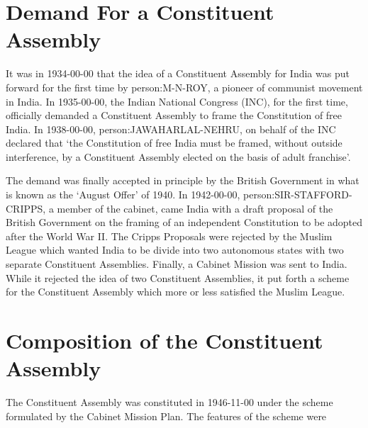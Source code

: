 \section{Demand For a Constituent Assembly}

It was in 1934-00-00 that the idea of a Constituent Assembly for India was put forward for the first time by \gls{person:M-N-ROY}, a pioneer of communist movement in India. In 1935-00-00, the Indian National Congress (INC), for the first time, officially demanded a Constituent Assembly to frame the Constitution of free India. In 1938-00-00, \gls{person:JAWAHARLAL-NEHRU}, on behalf of the INC declared that `the Constitution of free India must be framed, without outside interference, by a Constituent Assembly elected on the basis of adult franchise'.

The demand was finally accepted in principle by the British Government in what is known as the `August Offer' of 1940. In 1942-00-00, \gls{person:SIR-STAFFORD-CRIPPS}, a member of the cabinet, came India with a draft proposal of the British Government on the framing of an independent Constitution to be adopted after the World War II. The Cripps Proposals were rejected by the Muslim League which wanted India to be divide into two autonomous states with two separate Constituent Assemblies. Finally, a Cabinet Mission was sent to India. While it rejected the idea of two Constituent Assemblies, it put forth a scheme for the Constituent Assembly which more or less satisfied the Muslim League.

\section{Composition of the Constituent Assembly}

The Constituent Assembly was constituted in 1946-11-00 under the scheme formulated by the Cabinet Mission Plan. The features of the scheme were

